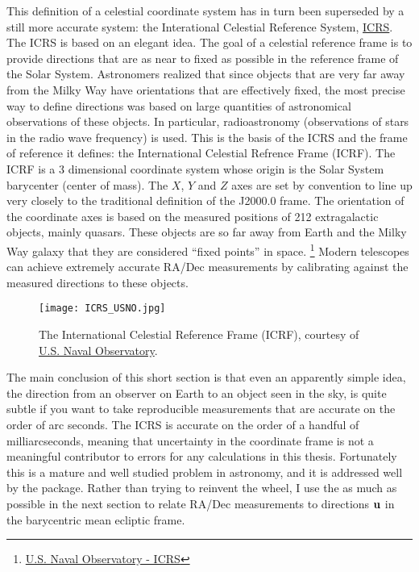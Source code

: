This definition of a celestial coordinate system has in turn been superseded by a still more accurate system:
the Interational Celestial Reference System, \href{https://en.wikipedia.org/wiki/International_Celestial_Reference_System}{ICRS}.
The ICRS is based on an elegant idea.
The goal of a celestial reference frame is to provide directions that are as near to fixed as possible in the reference frame of the Solar System.
Astronomers realized that since objects that are very far away from the Milky Way have orientations that are effectively fixed,
the most precise way to define directions was based on large quantities of astronomical observations of these objects.
In particular, radioastronomy (observations of stars in the radio wave frequency) is used.
This is the basis of the ICRS and the frame of reference it defines: the International Celestial Refrence Frame (ICRF).
The ICRF is a 3 dimensional coordinate system whose origin is the Solar System barycenter (center of mass).
The $X$, $Y$ and $Z$ axes are set by convention to line up very closely to the traditional definition of the J2000.0 frame.
The orientation of the coordinate axes is based on the measured positions of 212 extragalactic objects, mainly quasars.
These objects are so far away from Earth and the Milky Way galaxy that they are considered ``fixed points'' in space.
\footnote{\href{http://kejian1.cmatc.cn/vod/comet/oceans/naval_observatory/navmenu.php_tab_1_page_3.2.1_type_text.htm}{U.S. Naval Observatory - ICRS}}
Modern telescopes can achieve extremely accurate RA/Dec measurements by calibrating against the measured directions to these objects.
\begin{figure}[hbt!]
\begin{center}
\texttt{[image: ICRS\_USNO.jpg]}
\caption{The International Celestial Reference Frame (ICRF), courtesy of 
\href{http://kejian1.cmatc.cn/vod/comet/oceans/naval_observatory/navmenu.php_tab_1_page_3.2.1_type_text.htm}{U.S. Naval Observatory}.}
\end{center}
\end{figure}

The main conclusion of this short section is that even an apparently simple idea, the direction from an observer on Earth to an object seen in the sky,
is quite subtle if you want to take reproducible measurements that are accurate on the order of arc seconds.
The ICRS is accurate on the order of a handful of milliarcseconds, 
meaning that uncertainty in the coordinate frame is not a meaningful contributor to errors for any calculations in this thesis.
Fortunately this is a mature and well studied problem in astronomy, and it is addressed well by the  package.
Rather than trying to reinvent the wheel, I use the  as much as possible in the next section
to relate RA/Dec measurements to directions $\mathbf{u}$ in the barycentric mean ecliptic frame.

